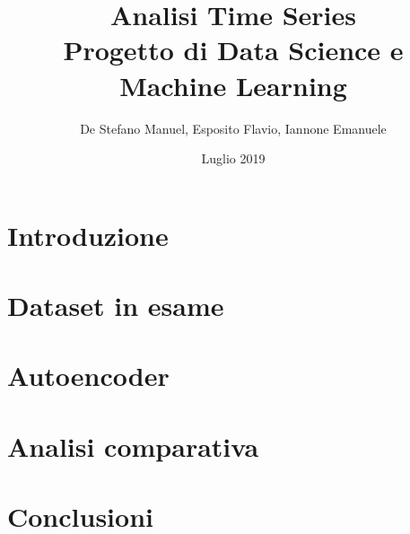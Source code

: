 \documentclass[12pt]{report}
\title{
	Analisi Time Series\\
	\large Progetto di Data Science e Machine Learning
}
\author{De Stefano Manuel, Esposito Flavio, Iannone Emanuele}
\date{Luglio 2019}
\begin{document}
\maketitle
\tableofcontents

\chapter{Introduzione} \label{chap:intro}


\chapter{Dataset in esame} \label{chap:dataset}


\chapter{Autoencoder} \label{chap:autoencoder}


\chapter{Analisi comparativa} \label{chap:comparison}


\chapter{Conclusioni} \label{chap:conclusioni}


\printbibliography
\end{document}
